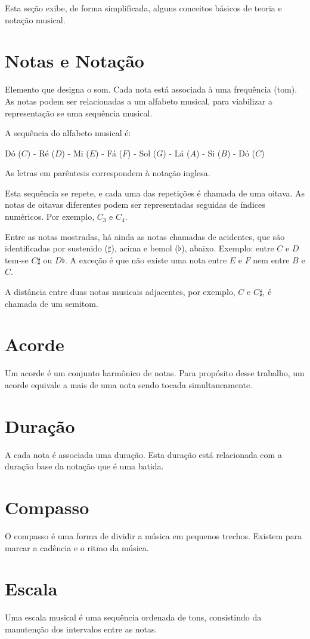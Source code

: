 \label{ape:notacao}

Esta seção exibe, de forma simplificada, alguns conceitos básicos de teoria e notação musical.

\section{Notas e Notação}

Elemento que designa o som. Cada nota está associada à uma frequência (tom). 
As notas podem ser relacionadas a um alfabeto musical, para viabilizar a representação se uma sequência musical.

A sequência do alfabeto musical é:

Dó ($C$) - Ré ($D$) - Mi ($E$) - Fá ($F$) - Sol ($G$) - Lá ($A$) - Si ($B$) - Dó ($C$)

As letras em parêntesis correspondem à notação inglesa.

Esta sequência se repete, e cada uma das repetições é chamada de uma oitava. As notas de oitavas diferentes podem ser representadas seguidas de índices numéricos. Por exemplo, $C_3$ e $C_4$.

Entre as notas mostradas, há ainda as notas chamadas de acidentes, que são identificadas por sustenido ($\sharp$), acima e bemol ($\flat$), abaixo. Exemplo: entre $C$ e $D$ tem-se $C\sharp$ ou $D\flat$. A exceção é que não existe uma nota entre $E$ e $F$ nem entre $B$ e $C$.

A distância entre duas notas musicais adjacentes, por exemplo, $C$ e $C\sharp$, é chamada de um semitom.

\section{Acorde}

Um acorde é um conjunto harmônico de notas. Para propósito desse trabalho, um acorde equivale a mais de uma nota sendo tocada simultaneamente.

\section{Duração}

A cada nota é associada uma duração. Esta duração está relacionada com a duração base da notação que é uma batida.

\section{Compasso}

O compasso é uma forma de dividir a música em pequenos trechos. Existem para marcar a cadência e o ritmo da música.

\section{Escala}

Uma escala musical é uma sequência ordenada de tons, consistindo da manutenção dos intervalos entre as notas.